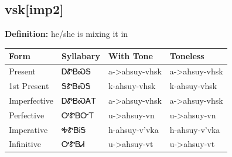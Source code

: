 \documentclass{article}%
\begin{document}
\subsection*{vsk[imp2]}%
\textbf{Definition: }%
he/she is mixing it in%
\\[0.5em]%
\begin{tabular}{|l|l|l|l|}%
\hline%
\textbf{Form}&\textbf{Syllabary}&\textbf{With Tone}&\textbf{Toneless}\\%
\hline%
Present&ᎠᏑᏴᏍᎦ&a{-}>ahsuy{-}vhsk&a{-}>ahsuy{-}vhsk\\%
1st Present&ᎦᏑᏴᏍᎦ&k{-}ahsuy{-}vhsk&k{-}ahsuy{-}vhsk\\%
Imperfective&ᎠᏑᏴᏍᎪᎢ&a{-}>ahsuy{-}vhsk&a{-}>ahsuy{-}vhsk\\%
Perfective&ᎤᏑᏴᏅᎢ&u{-}>ahsuy{-}vn&u{-}>ahsuy{-}vn\\%
Imperative&ᎭᏑᏴᎥᎦ&h{-}ahsuy{-}v'vka&h{-}ahsuy{-}v'vka\\%
Infinitive&ᎤᏑᏴᏗ&u{-}>ahsuy{-}vt&u{-}>ahsuy{-}vt\\%
\hline%
\end{tabular}%
\\[1em]%
\end{document}
